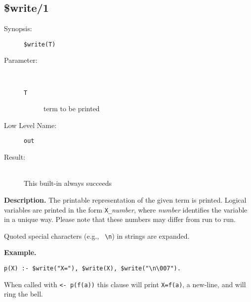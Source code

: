 %
%
%
\subsection{\$write/1}

\begin{description}
\item[Synopsis:]
	{\tt \$write(T)}
\item[Parameter:]\ \\[-0.5cm]
	\begin{description}
	\item[{\tt T}] term to be printed
	\end{description}
\item[Low Level Name:]
	{\tt out}
\item[Result:]\ \\
This built-in always succeeds
\end{description}

\vspace*{0.5cm}
\noindent
{\bf Description.}
The printable representation of the given term is printed.
Logical variables are printed in the form {\tt X\_}{\em number}, where
{\em number\/} identifies the variable in a unique way.
Please note that these numbers may differ from run to run.

Quoted special characters (e.g., {\verb+ \n+}) in strings are expanded.

\vspace*{0.5cm}
\noindent
{\bf Example.}
\begin{verbatim}
p(X) :- $write("X="), $write(X), $write("\n\007").
\end{verbatim}

When called with {\tt <- p(f(a))} this clause will print
{\tt X=f(a)}, a new-line, and will ring the bell.

